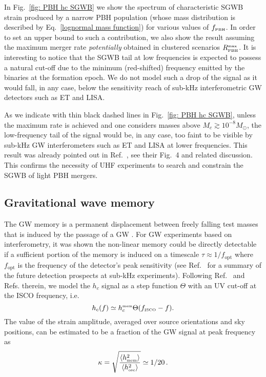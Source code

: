 \documentclass[11pt,a4paper]{article}
\newcommand{\PBH}{\text{\tiny PBH}}
\begin{document}
In Fig.~\ref{fig: PBH hc SGWB} we show the spectrum of characteristic SGWB strain produced by a narrow PBH population (whose mass distribution is described by Eq.~\eqref{lognormal mass function}) for various values of $f_\PBH$. 
In order to set an upper bound to such a contribution, we also show the result assuming the maximum merger rate {\it potentially} obtained in clustered scenarios $R_\text{\tiny PBH}^\text{\tiny max}$.
It is interesting to notice that the SGWB tail at low frequencies is expected to possess a natural cut-off due to the minimum (red-shifted) frequency emitted by the binaries at the formation epoch. 
We do not model such a drop of the signal as it would fall, in any case, below the sensitivity reach of sub-kHz interferometric GW detectors such as ET and LISA. 


As we indicate with thin black dashed lines in Fig.~\ref{fig: PBH hc SGWB}, unless the maximum rate is achieved and one considers masses above $M_c\gtrsim 10^{-8} M_\odot$, 
the low-frequency tail of the signal would be, in any case, too faint to be visible by sub-kHz GW interferometers such as ET and LISA at lower frequencies. This result was already pointed out in 
Ref.~\cite{DeLuca:2021hde},  see their Fig.~4 and related discussion.
This confirms the necessity of UHF experiments to search and constrain the SGWB of light PBH mergers. 





\subsection{Gravitational wave memory}
\label{sec:Memory}

The GW memory is a permanent displacement between freely falling test masses that is induced by the passage of a GW \cite{Christodoulou:1991cr,PhysRevD.44.R2945,Blanchet:1992br,Favata:2008ti,Favata:2009ii,Pollney:2010hs,Lasky:2016knh,Hubner:2019sly,Ebersold:2020zah,Zhao:2021hmx}. 
For GW experiments based on interferometry, it was shown 
the non-linear memory could be directly detectable if a sufficient portion of the memory is induced on a timescale $\tau \approx 1/f_\text{opt}$ where $f_\text{opt}$ is the frequency of the detector's peak sensitivity \cite{PhysRevD.45.520} (see Ref.~\cite{Johnson:2018xly} for a summary of the future detection prospects at sub-kHz experiments). 
Following Ref.~\cite{Johnson:2018xly} and Refs. therein, 
we model the $h_c$ signal as a step function $\Theta $ with an UV cut-off at the ISCO frequency, i.e.
\begin{equation}
h_c (f)	\simeq h_c^\text{\tiny mem} \Theta (f_\text{\tiny ISCO} -f ).
\end{equation}
The value of the strain amplitude, averaged over source orientations and sky positions, can be estimated to be a fraction of the GW signal at peak frequency~\cite{PhysRevLett.118.181103} as
\begin{equation}
\kappa = \sqrt{\frac{\langle h_\text{\tiny mem}^2\rangle}{\langle h_\text{\tiny osc}^2 \rangle}} \simeq 1/20 \,. 	
\end{equation}
\end{document}
